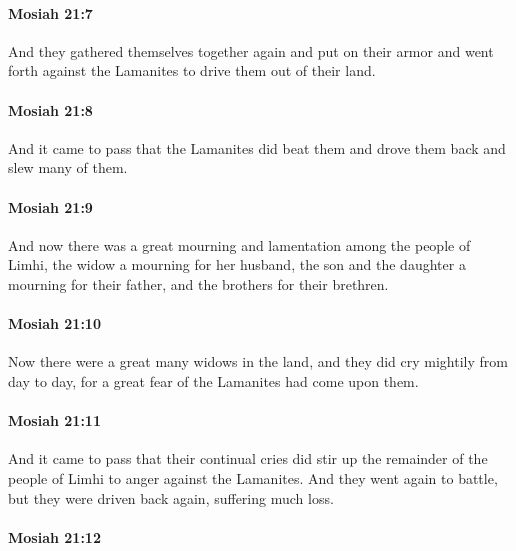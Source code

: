 		\paragraph{Mosiah 21:7} %
			\label{MOSIAH-21-7}

			And they gathered themselves together again and put on their armor
			and went forth against the Lamanites to drive them out of their land.

		\paragraph{Mosiah 21:8} %
			\label{MOSIAH-21-8}

			And it came to pass that the Lamanites did beat them
			and drove them back and slew many of them.

		\paragraph{Mosiah 21:9} %
			\label{MOSIAH-21-9}

			And now there was a great mourning and lamentation among the people of Limhi,
			the widow a mourning for her husband,
			the son and the daughter a mourning for their father,
			and the brothers for their brethren.

		\paragraph{Mosiah 21:10} %
			\label{MOSIAH-21-10}

			Now there were a great many widows in the land,
			and they did cry mightily from day to day,
			for a great fear of the Lamanites had come upon them.

		\paragraph{Mosiah 21:11} %
			\label{MOSIAH-21-11}

			And it came to pass that
			their continual cries did stir up the remainder of the people of Limhi
			to anger against the Lamanites.
			And they went again to battle,
			but they were driven back again,
			suffering much loss.

		\paragraph{Mosiah 21:12} %
			\label{MOSIAH-21-12}

